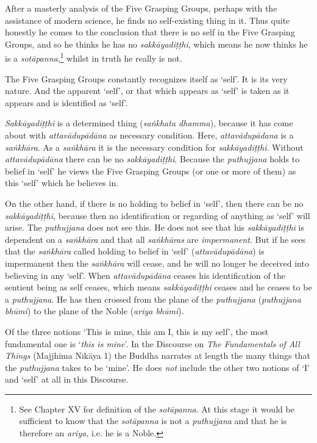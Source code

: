 After a masterly analysis of the Five Grasping Groups, perhaps with the assistance of modern science, he finds no self-existing thing in it. Thus quite honestly he comes to the conclusion that there is no self in the Five Grasping Groups, and so he thinks he has no \textit{sakkāyadiṭṭhi}, which means he now thinks he is a \textit{sotāpanna},\footnote{See Chapter XV for definition of the \textit{sotāpanna}. At this stage it would be sufficient to know that the \textit{sotāpanna} is not a \textit{puthujjana} and that he is therefore an \textit{ariya}, i.e. he is a Noble.} whilst in truth he really is not.

The Five Grasping Groups constantly recognizes itself as `self'. It is its very nature. And the apparent `self', or that which appears as `self' is taken as it appears and is identified as `self'.

\textit{Sakkāyadiṭṭhi} is a determined thing (\textit{saṅkhata dhamma}), because it has come about with \textit{attavādupādāna} as necessary condition. Here, \textit{attavādupādana} is a \textit{saṅkhāra}. As a \textit{saṅkhāra} it is the necessary condition for \textit{sakkāyadiṭṭhi}. Without \textit{attavādupādāna} there can be no \textit{sakkāyadiṭṭhi}. Because the \textit{puthujjana} holds to belief in `self' he views the Five Grasping Groups (or one or more of them) as this `self' which he believes in.

On the other hand, if there is no holding to belief in `self', then there can be no \textit{sakkāyadiṭṭhi}, because then no identification or regarding of anything as `self' will arise. The \textit{puthujjana} does not see this. He does not see that his \textit{sakkāyadiṭṭhi} is dependent on a \textit{saṅkhāra} and that all \textit{saṅkhāras} are \emph{impermanent}. But if he sees that the \textit{saṅkhāra} called holding to belief in `self' (\textit{attavādupādāna}) is impermanent then the \textit{saṅkhāra} will cease, and he will no longer be deceived into believing in any `self'. When \textit{attavādupādāna} ceases his identification of the sentient being as self ceases, which means \textit{sakkāyadiṭṭhi} ceases and he ceases to be a \textit{puthujjana}. He has then crossed from the plane of the \textit{puthujjana} (\textit{puthujjana bhūmi}) to the plane of the Noble (\textit{ariya bhūmi}).

Of the three notions `This is mine, this am I, this is my self', the most fundamental one is `\emph{this is mine}'. In the Discourse on \textit{The Fundamentals of All Things} (Majjhima Nikāya 1) the Buddha narrates at length the many things that the \textit{puthujjana} takes to be `mine'. He does \emph{not} include the other two notions of `I' and `self' at all in this Discourse.

